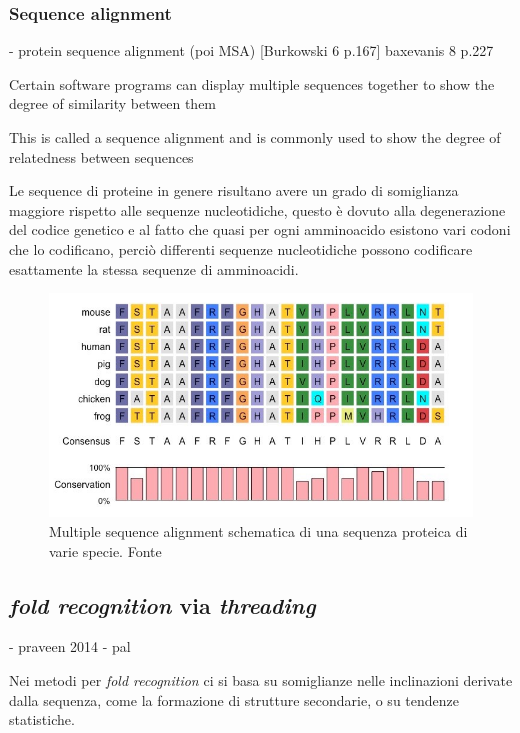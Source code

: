 \subsubsection{Sequence alignment} \label{sec:MSA}
- protein sequence alignment (poi MSA)
[Burkowski 6 p.167]
baxevanis 8 p.227


Certain software programs can display multiple sequences together to show the degree of similarity between them

This is called a sequence alignment and is commonly used to show the degree of relatedness between sequences

Le sequence di proteine in genere risultano avere un grado di somiglianza maggiore rispetto alle sequenze nucleotidiche, questo è dovuto alla degenerazione del codice genetico e al fatto che quasi per ogni amminoacido esistono vari codoni che lo codificano, perciò differenti sequenze nucleotidiche possono codificare esattamente la stessa sequenze di amminoacidi.

\begin{figure}[!htb]
	\centering
	\includegraphics[scale=0.5]{images/msa.jpeg}
	\caption{Multiple sequence alignment schematica di una sequenza proteica di varie specie. Fonte\cite{msaBioNinja}}
	\label{fig:msa}
\end{figure}

\subsection{\textit{fold recognition} via \textit{threading}}
- praveen 2014
- pal 

Nei metodi per \textit{fold recognition} ci si basa su somiglianze nelle inclinazioni derivate dalla sequenza, come la formazione di strutture secondarie, o su tendenze statistiche.


